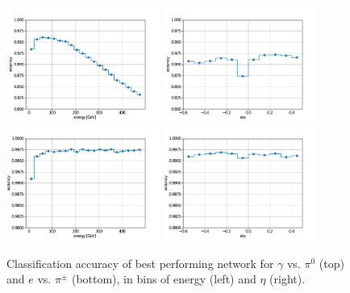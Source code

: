 \begin{figure}[htbp]
\centering
\includegraphics[width=0.45\textwidth]{Images/Calo/gamma_pi0_accuracy_energy_bins.pdf}
\includegraphics[width=0.45\textwidth]{Images/Calo/gamma_pi0_accuracy_eta_bins.pdf} \\
\includegraphics[width=0.45\textwidth]{Images/Calo/ele_chpi_accuracy_energy_bins.pdf}
\includegraphics[width=0.45\textwidth]{Images/Calo/ele_chpi_accuracy_eta_bins.pdf}
\caption{Classification accuracy of best performing network for $\gamma$ vs. $\pi^0$ (top) and $e$ vs. $\pi^\pm$ (bottom), in bins of energy (left) and $\eta$ (right).}
\label{fig:accuracy_bins}
\end{figure}


